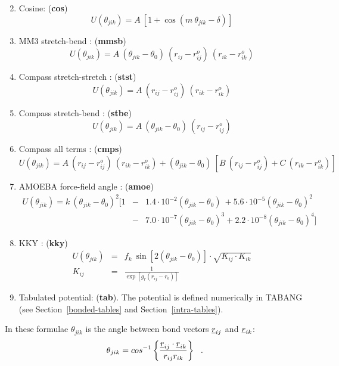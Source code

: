 \begin{enumerate}
\begin{equation}
\end{equation}
\item Cosine:  ({\bf cos})
\begin{equation}
U(\theta_{jik}) = A~[1 + \cos(m~\theta_{jik}-\delta)]
\end{equation}
\item MM3 stretch-bend \cite{allinger-89a}:  ({\bf mmsb})
\begin{equation}
U(\theta_{jik}) = A~(\theta_{jik}-\theta_{0})~(r_{ij} - r_{ij}^{o})~(r_{ik} - r_{ik}^{o})
\end{equation}
\item Compass stretch-stretch \cite{sun-98a}:  ({\bf stst})
\begin{equation}
U(\theta_{jik}) = A~(r_{ij} - r_{ij}^{o})~(r_{ik} - r_{ik}^{o})
\end{equation}
\item Compass stretch-bend \cite{sun-98a}:  ({\bf stbe})
\begin{equation}
U(\theta_{jik}) = A~(\theta_{jik}-\theta_{0})~(r_{ij} - r_{ij}^{o})
\end{equation}
\item Compass all terms \cite{sun-98a}:  ({\bf cmps})
\begin{equation}
U(\theta_{jik}) = A~(r_{ij} - r_{ij}^{o})~(r_{ik} - r_{ik}^{o}) +
(\theta_{jik}-\theta_{0})~[B~(r_{ij} - r_{ij}^{o})+C~(r_{ik} - r_{ik}^{o})]
\end{equation}
\item AMOEBA force-field angle \cite{ponder-10a}:  ({\bf amoe})
\begin{eqnarray}
U(\theta_{jik}) = k~(\theta_{jik}-\theta_{0})^{2}[1 &-& 1.4 \cdot 10^{-2}(\theta_{jik}-\theta_{0})^{~}+5.6 \cdot 10^{-5}(\theta_{jik}-\theta_{0})^{2} \nonumber \\
&-& 7.0 \cdot 10^{-7}(\theta_{jik}-\theta_{0})^{3}+2.2 \cdot 10^{-8}(\theta_{jik}-\theta_{0})^{4}]
\end{eqnarray}
\item KKY \cite{kumagai-94a}:  ({\bf kky})
\begin{eqnarray}
U(\theta_{jik}) &=& f_{k}~\sin\left[2(\theta_{jik}-\theta_{0})\right] \cdot \sqrt{K_{ij} \cdot K_{ik}} \nonumber \\
K_{ij} &=& \frac{1}{\exp\left[g_{r}(r_{ij}-r_{o})\right]}
\end{eqnarray}
\item Tabulated potential:  ({\bf tab}).  The potential is defined numerically in TABANG (see Section~\ref{bonded-tables} and Section~\ref{intra-tables}).
\end{enumerate}
In these formulae $\theta_{jik}$ is the angle between bond vectors
$\mbox{$\underline{r}$}_{ij}$ and $\mbox{$\underline{r}$}_{ik}$:
\begin{equation}
\theta_{jik}=cos^{-1}\left\{\frac{\mbox{$\underline{r}$}_{ij}\cdot\mbox{$\underline{r}$}_{ik}}
{r_{ij}r_{ik}}\right\}~~.
\end{equation}

